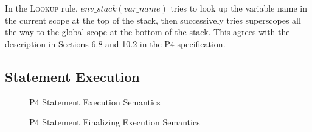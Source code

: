 \documentclass[UTF8]{article}
\begin{document}
In the \textsc{Lookup} rule, $\mathit{env\_stack}(\mathit{var\_name})$ tries to look up the variable name in the current scope at the top of the stack, then successively tries superscopes all the way to the global scope at the bottom of the stack. This agrees with the description in Sections 6.8 and 10.2 in the P4 specification.

\newpage
\subsection{Statement Execution}

\begin{figure}[h!]
\ottdefnsstmtXXsem
\caption{P4 Statement Execution Semantics}
\label{fig:semstmtexec}
\end{figure}

\begin{figure}[h!]
\ottdefnsstmtXXsemXXfin
\caption{P4 Statement Finalizing Execution Semantics}
\label{fig:semfinstmtexec}
\end{figure}

%
%

\printbibliography
\end{document}
